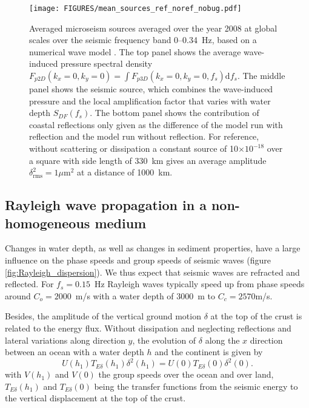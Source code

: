 \begin{figure}
\centerline{\texttt{[image: FIGURES/mean\_sources\_ref\_noref\_nobug.pdf]}}
  \caption{Averaged microseism sources averaged over the year 2008 at global scales over the seismic frequency band 0--0.34~Hz, based on a numerical wave model 
\citep{Ardhuin&al.2011}. The top panel shows the average wave-induced pressure spectral density  
$F_{p2D}(k_x=0,k_y=0)=\int F_{p3D}(k_x=0,k_y=0,f_s) {\mathrm d}f_s$. The middle panel shows the seismic source, which combines the wave-induced pressure 
and the local amplification factor that varies with water depth
$S_{DF}(f_s)$. The bottom panel shows the contribution of coastal reflections only given as the difference of the model run with reflection and the model run without 
reflection. For reference, without scattering or dissipation a constant source of 10$\times 10^{-18}$ over a square with side length of 330~km gives 
an average amplitude $\delta_{\mathrm{rms}}^2=1\mu$m$^2$ at a distance of  1000~km.}
\label{fig:sismo_source}
\end{figure}

\subsection{Rayleigh wave propagation in a non-homogeneous medium}
Changes in water depth, as well as changes in sediment properties, have a large influence on the phase speeds and group speeds of seismic waves (figure \ref{fig:Rayleigh_dispersion}). We thus expect  that seismic waves are refracted and reflected. For $f_s=0.15$~Hz   Rayleigh waves typically speed up from phase speeds around $C_o=2000$~m/s with a water depth of 3000~m to  $C_c=2570$m/s. 

Besides, the amplitude of the vertical ground motion $\delta$ at the top 
of the crust is related to the energy flux. 
Without dissipation and neglecting reflections and lateral variations 
along   direction $y$, the evolution of $\delta$ along the $x$ direction 
between an ocean with a water depth $h$ and the continent is given by 
\begin{equation}
U(h_1) T_{E \delta}(h_1) \delta^2(h_1) = U(0) T_{E \delta}(0) \delta^2(0). 
\end{equation}
with $V(h_1)$ and $V(0)$ the group speeds over the ocean and over land, 
$T_{E \delta}(h_1)$ and $T_{E \delta}(0)$ being the transfer functions from the seismic energy to the vertical displacement at the top of the crust. 

